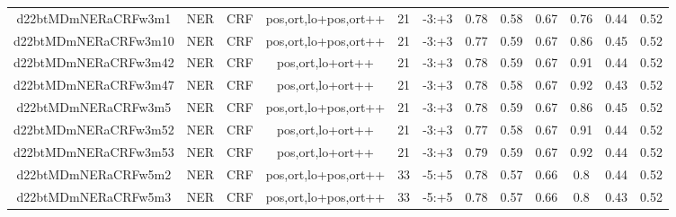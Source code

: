 \documentclass[a4paper]{article}
\begin{document}
\begin{landscape}
\begin{center}
\begin{tabular}{ |c|c|c|c|c|c|c|c|c|c|c|c|}
 	
 
 	
 		
 		\small{ d22btMDmNERaCRFw3m1 } & NER & CRF & pos,ort,lo+pos,ort++  &  21 &  -3:+3  &  0.78 & 0.58 & 0.67  &  0.76 & 0.44 & 0.52 \\
 		

 	
 
 	
 		
 		\small{ d22btMDmNERaCRFw3m10 } & NER & CRF & pos,ort,lo+pos,ort++  &  21 &  -3:+3  &  0.77 & 0.59 & 0.67  &  0.86 & 0.45 & 0.52 \\
 		

 	
 
 	
 		
 		\small{ d22btMDmNERaCRFw3m42 } & NER & CRF & pos,ort,lo+ort++  &  21 &  -3:+3  &  0.78 & 0.59 & 0.67  &  0.91 & 0.44 & 0.52 \\
 		

 	
 
 	
 		
 		\small{ d22btMDmNERaCRFw3m47 } & NER & CRF & pos,ort,lo+ort++  &  21 &  -3:+3  &  0.78 & 0.58 & 0.67  &  0.92 & 0.43 & 0.52 \\
 		

 	
 
 	
 		
 		\small{ d22btMDmNERaCRFw3m5 } & NER & CRF & pos,ort,lo+pos,ort++  &  21 &  -3:+3  &  0.78 & 0.59 & 0.67  &  0.86 & 0.45 & 0.52 \\
 		

 	
 
 	
 		
 		\small{ d22btMDmNERaCRFw3m52 } & NER & CRF & pos,ort,lo+ort++  &  21 &  -3:+3  &  0.77 & 0.58 & 0.67  &  0.91 & 0.44 & 0.52 \\
 		

 	
 
 	
 		
 		\small{ d22btMDmNERaCRFw3m53 } & NER & CRF & pos,ort,lo+ort++  &  21 &  -3:+3  &  0.79 & 0.59 & 0.67  &  0.92 & 0.44 & 0.52 \\
 		

 	
 
 	
 		
 		\small{ d22btMDmNERaCRFw5m2 } & NER & CRF & pos,ort,lo+pos,ort++  &  33 &  -5:+5  &  0.78 & 0.57 & 0.66  &  0.8 & 0.44 & 0.52 \\
 		

 	
 
 	
 		
 		\small{ d22btMDmNERaCRFw5m3 } & NER & CRF & pos,ort,lo+pos,ort++  &  33 &  -5:+5  &  0.78 & 0.57 & 0.66  &  0.8 & 0.43 & 0.52 \\
 		


\end{tabular}
\end{center}
\end{landscape}
\end{document}
